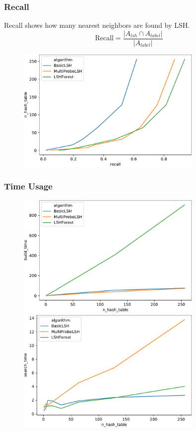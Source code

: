 \begin{frame}[allowframebreaks]
\frametitle{Recall}
Recall shows how many nearest neighbors are found by LSH.
\begin{equation}
	\text{Recall}=\frac{|A_{lsh}\cap A_{label}|}{|A_{label}|}
\end{equation}
\pagebreak
\begin{figure}
\includegraphics[width=0.8\textwidth]{figures/recall}
\end{figure}
\end{frame}

\begin{frame}[allowframebreaks]
\frametitle{Time Usage}
\begin{figure}
\includegraphics[width=0.8\textwidth]{figures/build_time}
\includegraphics[width=0.8\textwidth]{figures/search_time}
\end{figure}
\end{frame}


